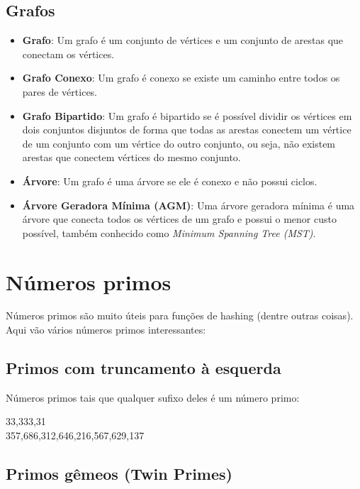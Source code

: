 \documentclass[10pt, a4paper, oneside]{book}
\begin{document}
\subsection{Grafos}

\begin{itemize}
  \item \textbf{Grafo}: Um grafo é um conjunto de vértices e um conjunto de arestas que conectam os vértices.
  \item \textbf{Grafo Conexo}: Um grafo é conexo se existe um caminho entre todos os pares de vértices.
  \item \textbf{Grafo Bipartido}: Um grafo é bipartido se é possível dividir os vértices em dois conjuntos disjuntos de forma que todas as arestas conectem um vértice de um conjunto com um vértice do outro conjunto, ou seja, não existem arestas que conectem vértices do mesmo conjunto.
  \item \textbf{Árvore}: Um grafo é uma árvore se ele é conexo e não possui ciclos.
  \item \textbf{Árvore Geradora Mínima (AGM)}: Uma árvore geradora mínima é uma árvore que conecta todos os vértices de um grafo e possui o menor custo possível, também conhecido como \textit{Minimum Spanning Tree (MST)}.
\end{itemize}


\section{Números primos}

Números primos são muito úteis para funções de hashing (dentre outras coisas). Aqui vão vários números primos interessantes:


\subsection{Primos com truncamento à esquerda}

Números primos tais que qualquer sufixo deles é um número primo:

\begin{center}
\LARGE
33,333,31 \\
\LARGE
357,686,312,646,216,567,629,137
\end{center}


\subsection{Primos gêmeos (Twin Primes)}
\end{document}
